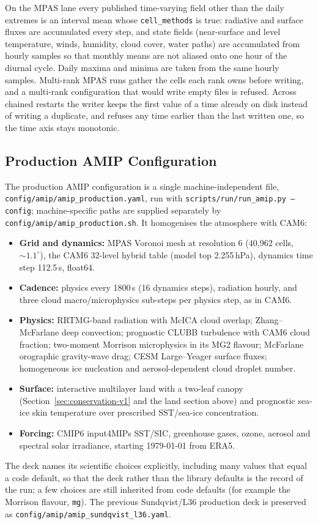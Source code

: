 \documentclass[11pt,a4paper]{article}
\begin{document}
On the MPAS lane every published time-varying field other than the daily extremes is an interval mean whose \texttt{cell\_methods} is true: radiative and surface fluxes are accumulated every step, and state fields (near-surface and level temperature, winds, humidity, cloud cover, water paths) are accumulated from hourly samples so that monthly means are not aliased onto one hour of the diurnal cycle.  Daily maxima and minima are taken from the same hourly samples.  Multi-rank MPAS runs gather the cells each rank owns before writing, and a multi-rank configuration that would write empty files is refused.  Across chained restarts the writer keeps the first value of a time already on disk instead of writing a duplicate, and refuses any time earlier than the last written one, so the time axis stays monotonic.

\subsection{Production AMIP Configuration}
\label{sec:amip-production}

The production AMIP configuration is a single machine-independent file, \texttt{config/amip/amip\_production.yaml}, run with \texttt{scripts/run/run\_amip.py --config}; machine-specific paths are supplied separately by \texttt{config/amip/amip\_production.sh}.  It homogenises the atmosphere with CAM6:
\begin{itemize}[nosep]
  \item \textbf{Grid and dynamics:} MPAS Voronoi mesh at resolution 6 (40{,}962 cells, ${\sim}1.1^\circ$), the CAM6 32-level hybrid table (model top 2.255\,hPa), dynamics time step 112.5\,s, float64.
  \item \textbf{Cadence:} physics every 1800\,s (16 dynamics steps), radiation hourly, and three cloud macro/microphysics sub-steps per physics step, as in CAM6.
  \item \textbf{Physics:} RRTMG-band radiation with McICA cloud overlap; Zhang--McFarlane deep convection; prognostic CLUBB turbulence with CAM6 cloud fraction; two-moment Morrison microphysics in its MG2 flavour; McFarlane orographic gravity-wave drag; CESM Large--Yeager surface fluxes; homogeneous ice nucleation and aerosol-dependent cloud droplet number.
  \item \textbf{Surface:} interactive multilayer land with a two-leaf canopy (Section~\ref{sec:conservation-v1} and the land section above) and prognostic sea-ice skin temperature over prescribed SST/sea-ice concentration.
  \item \textbf{Forcing:} CMIP6 input4MIPs SST/SIC, greenhouse gases, ozone, aerosol and spectral solar irradiance, starting 1979-01-01 from ERA5.
\end{itemize}
The deck names its scientific choices explicitly, including many values that equal a code default, so that the deck rather than the library defaults is the record of the run; a few choices are still inherited from code defaults (for example the Morrison flavour, \texttt{mg}).  The previous Sundqvist/L36 production deck is preserved as \texttt{config/amip/amip\_sundqvist\_l36.yaml}.
\end{document}
